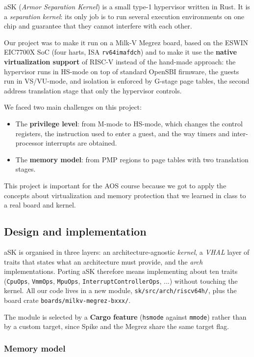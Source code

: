 \documentclass[10pt,a4]{article}
\begin{document}
aSK (\emph{Armor Separation Kernel}) is a small type-1 hypervisor written in
Rust. It is a \emph{separation kernel}:
its only job is to run several execution environments on one chip and guarantee
that they cannot interfere with each other.

Our project was to make it run on a Milk-V Megrez board, based on
the ESWIN EIC7700X SoC (four harts, ISA \texttt{rv64imafdch}) and
to make it use the \textbf{native virtualization support} of RISC-V instead of
the hand-made approach: the hypervisor runs in HS-mode on top of standard
OpenSBI firmware, the guests run in VS/VU-mode, and isolation is enforced by
G-stage page tables, the second address translation stage that only the
hypervisor controls.

We faced two main challenges on this project:
\begin{itemize}
\item The \textbf{privilege level}: from M-mode to HS-mode, which changes the
control registers, the instruction used to enter a guest, and the way timers
and inter-processor interrupts are obtained.
\item The \textbf{memory model}: from PMP regions to page tables with
two translation stages.
\end{itemize}

This project is important for the AOS course because we got to apply the concepts about
virtualization and memory protection that we learned in class to a real board and kernel.

\subsection{Design and implementation}

aSK is organised in three layers: an architecture-agnostic \emph{kernel}, a
\emph{VHAL} layer of traits that states what an architecture must provide, and
the \emph{arch} implementations. Porting aSK therefore means implementing about
ten traits (\texttt{CpuOps}, \texttt{VmmOps}, \texttt{MpuOps},
\texttt{InterruptControllerOps}, ...) without touching the kernel.
All our code lives in a new module,
\texttt{sk/src/arch/riscv64h/}, plus the board crate
\texttt{boards/milkv-megrez-bxxx/}.

The module is selected by a \textbf{Cargo feature} (\texttt{hsmode} against
\texttt{mmode}) rather than by a custom target, since Spike and the Megrez share
the same target flag.

\subsubsection*{Memory model}
\end{document}
